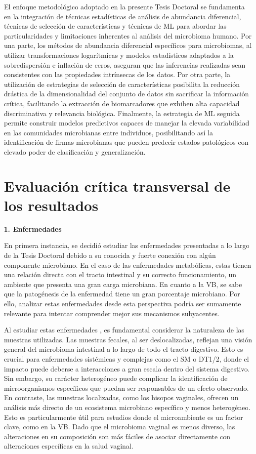 El enfoque metodológico adoptado en la presente Tesis Doctoral se fundamenta en la integración de técnicas estadísticas de análisis de abundancia diferencial, técnicas de selección de características y técnicas de ML para abordar las particularidades y limitaciones inherentes al análisis del microbioma humano. Por una parte, los métodos de abundancia diferencial específicos para microbiomas, al utilizar transformaciones logarítmicas y modelos estadísticos adaptados a la sobredispersión e inflación de ceros, aseguran que las inferencias realizadas sean consistentes con las propiedades intrínsecas de los datos. Por otra parte, la utilización de estrategias de selección de características posibilita la reducción drástica de la dimensionalidad del conjunto de datos sin sacrificar la información crítica, facilitando la extracción de biomarcadores que exhiben alta capacidad discriminativa y relevancia biológica. Finalmente, la estrategia de ML seguida permite construir modelos predictivos capaces de manejar la elevada variabilidad en las comunidades microbianas entre individuos, posibilitando así la identificación de firmas microbianas que pueden predecir estados patológicos con elevado poder de clasificación y generalización.


\section{Evaluación crítica transversal de los resultados}

\textbf{1. Enfermedades}

En primera instancia, se decidió estudiar las enfermedades presentadas a lo largo de la Tesis Doctoral debido a su conocida y fuerte conexión con algún componente microbiano. En el caso de las enfermedades metabólicas, estas tienen una relación directa con el tracto intestinal y su correcto funcionamiento, un ambiente que presenta una gran carga microbiana. En cuanto a la VB, se sabe que la patogénesis de la enfermedad tiene un gran porcentaje microbiano. Por ello, analizar estas enfermedades desde esta perspectiva podría ser sumamente relevante para intentar comprender mejor sus mecanismos subyacentes.

Al estudiar estas enfermedades \cite{paper1, paper2, paper3}, es fundamental considerar la naturaleza de las muestras utilizadas. Las muestras fecales, al ser deslocalizadas, reflejan una visión general del microbioma intestinal a lo largo de todo el tracto digestivo. Esto es crucial para enfermedades sistémicas y complejas como el SM o DT1/2, donde el impacto puede deberse a interacciones a gran escala dentro del sistema digestivo. Sin embargo, su carácter heterogéneo puede complicar la identificación de microorganismos específicos que puedan ser responsables de un efecto observado. En contraste, las muestras localizadas, como los hisopos vaginales, ofrecen un análisis más directo de un ecosistema microbiano específico y menos heterogéneo. Esto es particularmente útil para estudios donde el microambiente es un factor clave, como en la VB. Dado que el microbioma vaginal es menos diverso, las alteraciones en su composición son más fáciles de asociar directamente con alteraciones específicas en la salud vaginal.

